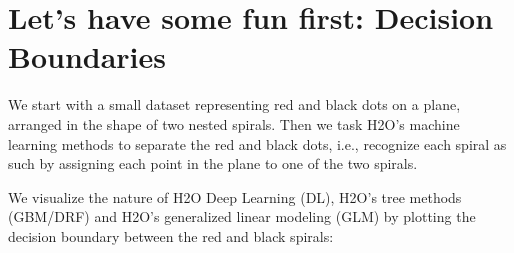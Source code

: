 \documentclass[]{book}
\begin{document}
\hypertarget{lets-have-some-fun-first-decision-boundaries}{%
\section{Let's have some fun first: Decision Boundaries}\label{lets-have-some-fun-first-decision-boundaries}}

We start with a small dataset representing red and black dots on a plane, arranged in the shape of two nested spirals. Then we task H2O's machine learning methods to separate the red and black dots, i.e., recognize each spiral as such by assigning each point in the plane to one of the two spirals.

We visualize the nature of H2O Deep Learning (DL), H2O's tree methods (GBM/DRF) and H2O's generalized linear modeling (GLM) by plotting the decision boundary between the red and black spirals:
\end{document}
